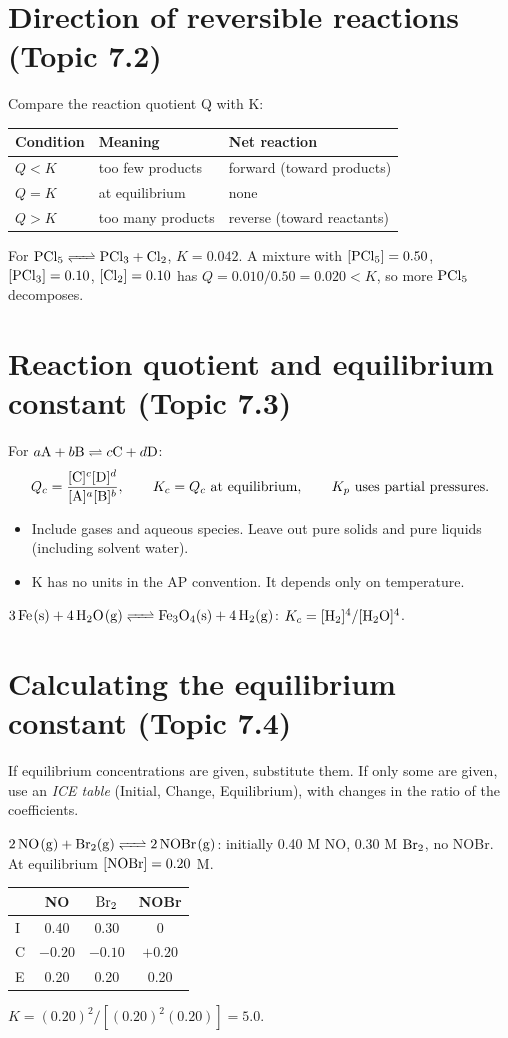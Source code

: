 \documentclass[11pt]{article}
\begin{document}
\section{Direction of reversible reactions (Topic 7.2)}\label{t:7.2}
Compare the reaction quotient Q with K:
\begin{center}
\begin{tabular}{lll}\toprule
Condition & Meaning & Net reaction \\ \midrule
$Q < K$ & too few products & forward (toward products) \\
$Q = K$ & at equilibrium & none \\
$Q > K$ & too many products & reverse (toward reactants) \\ \bottomrule
\end{tabular}
\end{center}
 For $\ce{PCl5 <=> PCl3 + Cl2}$, $K = 0.042$. A mixture with $[\ce{PCl5}] = 0.50$, $[\ce{PCl3}] = 0.10$, $[\ce{Cl2}] = 0.10$ has $Q = 0.010/0.50 = 0.020 < K$, so more $\ce{PCl5}$ decomposes.

\section{Reaction quotient and equilibrium constant (Topic 7.3)}\label{t:7.3}
For $a\ce{A} + b\ce{B} \rightleftharpoons c\ce{C} + d\ce{D}$:
\[ Q_c = \frac{[\ce{C}]^c[\ce{D}]^d}{[\ce{A}]^a[\ce{B}]^b}, \qquad K_c = Q_c \text{ at equilibrium}, \qquad K_p \text{ uses partial pressures.} \]
\begin{itemize}
\item Include gases and aqueous species. Leave out pure solids and pure liquids (including solvent water).
\item K has no units in the AP convention. It depends only on temperature.
\end{itemize}
 $\ce{3Fe(s) + 4H2O(g) <=> Fe3O4(s) + 4H2(g)}$: $K_c = [\ce{H2}]^4/[\ce{H2O}]^4$.

\section{Calculating the equilibrium constant (Topic 7.4)}\label{t:7.4}
If equilibrium concentrations are given, substitute them. If only some are given, use an \emph{ICE table} (Initial, Change, Equilibrium), with changes in the ratio of the coefficients.

 $\ce{2NO(g) + Br2(g) <=> 2NOBr(g)}$: initially 0.40 M NO, 0.30 M $\ce{Br2}$, no NOBr. At equilibrium $[\ce{NOBr}] = 0.20$ M.
\begin{center}
\begin{tabular}{lccc}\toprule
& NO & $\ce{Br2}$ & NOBr \\ \midrule
I & 0.40 & 0.30 & 0 \\
C & $-0.20$ & $-0.10$ & $+0.20$ \\
E & 0.20 & 0.20 & 0.20 \\ \bottomrule
\end{tabular}
\end{center}
$K = (0.20)^2/[(0.20)^2(0.20)] = 5.0$.
\end{document}
